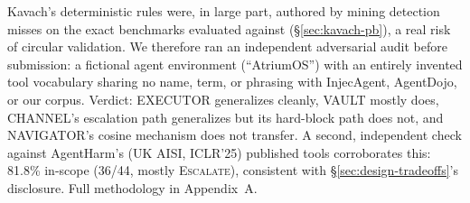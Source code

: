 Kavach's deterministic rules were, in large part, authored by mining
detection misses on the exact benchmarks evaluated against
(\S\ref{sec:kavach-pb}), a real risk of circular validation. We therefore
ran an independent adversarial audit before submission: a fictional agent
environment (``AtriumOS'') with an entirely invented tool vocabulary
sharing no name, term, or phrasing with InjecAgent, AgentDojo, or our
corpus. Verdict: EXECUTOR generalizes cleanly, VAULT mostly does,
CHANNEL's escalation path generalizes but its hard-block path does not,
and NAVIGATOR's cosine mechanism does not transfer. A second, independent
check against AgentHarm's (UK AISI, ICLR'25) published tools corroborates
this: 81.8\% in-scope (36/44, mostly \textsc{Escalate}), consistent with
\S\ref{sec:design-tradeoffs}'s disclosure. Full methodology in
Appendix~A.

